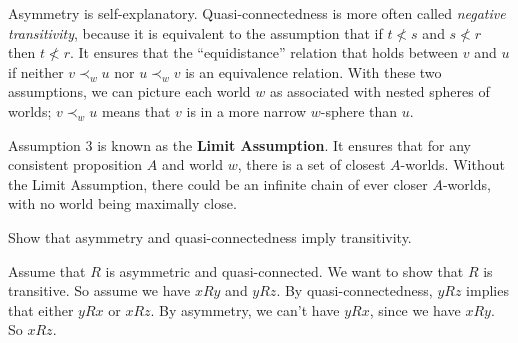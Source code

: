 Asymmetry is self-explanatory. Quasi-connectedness is more often called
\emph{negative transitivity}, because it is equivalent to the assumption that if
$t \not< s$ and $s\not<r$ then $t\not<r$. It ensures that the ``equidistance''
relation that holds between $v$ and $u$ if neither $v \prec_w u$ nor
$u \prec_w v$ is an equivalence relation. With these two assumptions, we can
picture each world $w$ as associated with nested spheres of worlds;
$v \prec_w u$ means that $v$ is in a more narrow $w$-sphere than $u$.

Assumption 3 is known as the \textbf{Limit Assumption}. It ensures that for any
consistent proposition $A$ and world $w$, there is a set of closest $A$-worlds.
Without the Limit Assumption, there could be an infinite chain of ever closer
$A$-worlds, with no world being maximally close.


\begin{exercise}
  Show that asymmetry and quasi-connectedness imply transitivity.
\end{exercise}
\begin{solution}
  Assume that $R$ is asymmetric and quasi-connected. We want to show that
  $R$ is transitive. So assume we have $xRy$ and $yRz$. By quasi-connectedness,
  $yRz$ implies that either $yRx$ or $xRz$. By asymmetry, we can't have $yRx$,
  since we have $xRy$. So $xRz$.
\end{solution}

